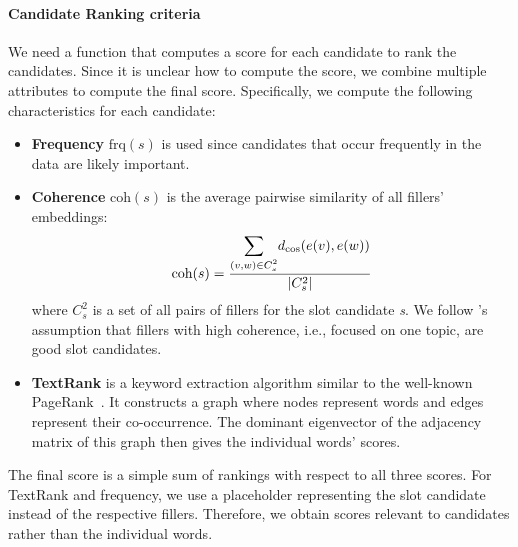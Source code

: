 \paragraph{Candidate Ranking criteria}
We need a function that computes a score for each candidate to rank the candidates.
Since it is unclear how to compute the score, we combine multiple attributes to compute the final score.
Specifically, we compute the following characteristics for each candidate:
\begin{itemize}
    \item \textbf{Frequency} $\text{frq}(s)$ is used since candidates that occur frequently in the data are likely important.
    
    \item \textbf{Coherence} $\text{coh}(s)$ is the average pairwise similarity of all fillers' embeddings:
    \begin{equation}
        \text{coh}(s) = \frac{\mathlarger{\sum}_{(v,w) \in C^2_s}{d_{\cos}(e(v), e(w))}}{|C^2_s|}
    \end{equation}
    where $C^2_s$ is a set of all pairs of fillers for the slot candidate \emph{s}.
    We follow \citet{chen2014leveraging}'s assumption that fillers with high coherence, i.e., focused on one topic, are good slot candidates.
    
    \item \textbf{TextRank} \cite{mihalcea2004textrank} is a keyword extraction algorithm similar to the well-known PageRank~\citep{page1999pagerank}.
    It constructs a graph where nodes represent words and edges represent their co-occurrence.
    The dominant eigenvector of the adjacency matrix of this graph then gives the individual words' scores.
\end{itemize}
The final score is a simple sum of rankings with respect to all three scores.
For TextRank and frequency, we use a placeholder representing the slot candidate instead of the respective fillers.
Therefore, we obtain scores relevant to candidates rather than the individual words.

